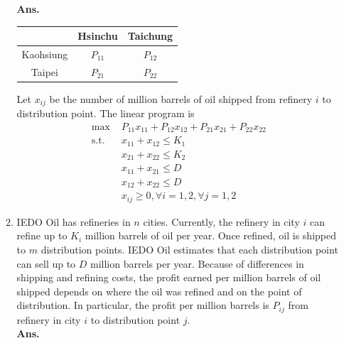 \documentclass[14pt]{article}
\begin{document}
\begin{enumerate}
\begin{enumerate}
                    \textbf{Ans.}
                    \begin{table}[H]
                        \centering
                        \begin{tabular}{|c|c|c|}
                            \hline
                                      & Hsinchu  & Taichung \\
                            \hline
                            Kaohsiung & $P_{11}$ & $P_{12}$ \\
                            \hline
                            Taipei    & $P_{21}$ & $P_{22}$ \\
                            \hline
                        \end{tabular}
                    \end{table}
                    Let $x_{ij}$ be the number of million barrels of oil shipped from refinery $i$ to distribution point. The linear program is
                    \begin{align*}
                        \text{max }  & P_{11}x_{11} + P_{12}x_{12} + P_{21}x_{21} + P_{22}x_{22} \\
                        \text{s.t. } & x_{11} + x_{12} \leq K_1                                  \\
                                     & x_{21} + x_{22} \leq K_2                                  \\
                                     & x_{11} + x_{21} \leq D                                    \\
                                     & x_{12} + x_{22} \leq D                                    \\
                                     & x_{ij} \geq 0, \forall i = 1,2, \forall j = 1,2
                    \end{align*}
              \item IEDO Oil has refineries in $n$ cities. Currently, the refinery in city $i$ can refine up to $K_i$ million barrels of oil per year. Once refined, oil is shipped to $m$ distribution points. IEDO Oil estimates that each distribution point can sell up to $D$ million barrels per year. Because of differences in shipping and refining costs, the profit earned per million barrels of oil shipped depends on where the oil was refined and on the point of distribution. In particular, the profit per million barrels is $P_{ij}$ from refinery in city $i$ to distribution point $j$.\\
                    \textbf{Ans.}\\

\end{enumerate}
\end{enumerate}
\end{document}
